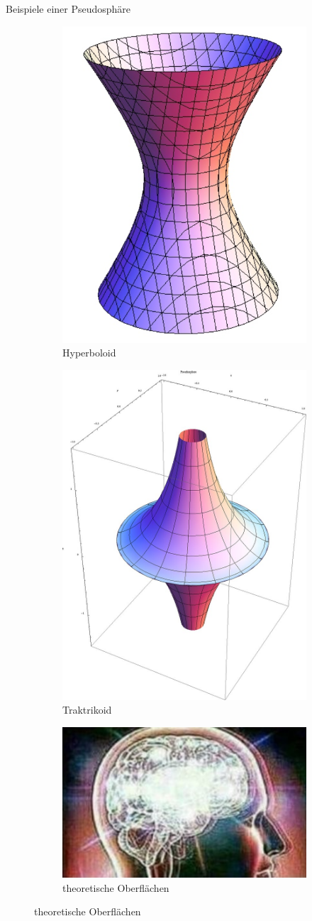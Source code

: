 \documentclass[12pt]{beamer}
\begin{document}
\begin{frame}{Beispiele einer Pseudosphäre}
\begin{figure}
\begin{subfigure}{.5\textwidth}
  \centering
  \includegraphics[width=.3\linewidth]{hyperboloid.png}
  \caption{Hyperboloid}
\end{subfigure}%
\begin{subfigure}{.5\textwidth}
  \centering
  \includegraphics[width=.3\linewidth]{pseudosphere.png}
  \caption{Traktrikoid}
\end{subfigure}
\begin{subfigure}{.5\textwidth}
  \centering
  \includegraphics[width=.3\linewidth]{theo_surface.png}
  \caption{theoretische Oberflächen}
\end{subfigure}
\end{figure}

\end{frame}
\end{document}
